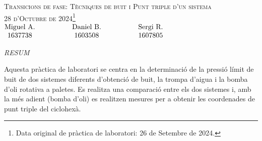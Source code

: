 \documentclass[12pt,twosides,onecolumn,openany]{article}
\begin{document}
\begin{center}
    {\Large \textsc{Transicions de fase: Tècniques de buit i Punt triple d’un sistema}}\\
    \vspace{0.2cm}
    \textsc{28 d'Octubre de 2024\footnote{Data original de pràctica de laboratori: 26 de Setembre de 2024.}}\\
    \vspace{0.2cm}
    $\begin{matrix} 
    \text{Miguel A.} \hspace{1.5cm} & \text{Daniel B.} & \hspace{1.5cm} \text{Sergi R.}\\1637738 \hspace{1.5cm} & 1603508 & \hspace{1.5cm} 1607805
    \end{matrix}$
\end{center}
\begin{center}
    \textsc{\textit{RESUM}}
\end{center}
Aquesta pràctica de laboratori se centra en la determinació de la pressió límit de buit de dos sistemes diferents d'obtenció de buit, la trompa d'aigua i la bomba d'oli rotativa a paletes. Es realitza una comparació entre els dos sistemes i, amb la més adient (bomba d'oli) es realitzen mesures per a obtenir les coordenades de punt triple del ciclohexà.
\vspace{0.5cm}
\end{document}

